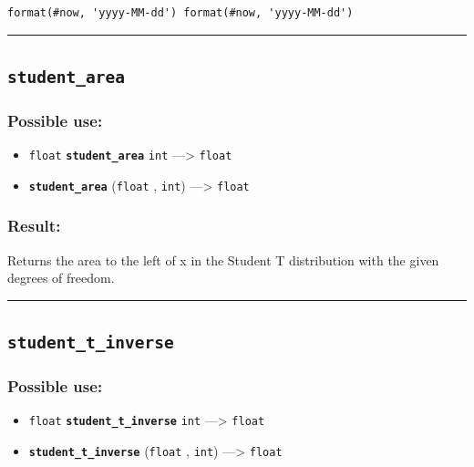\documentclass[]{book}
\providecommand{\tightlist}{%
  \setlength{\itemsep}{0pt}\setlength{\parskip}{0pt}}
\theoremstyle{definition}
\theoremstyle{definition}
\theoremstyle{definition}
\theoremstyle{remark}
\begin{document}
\begin{verbatim}
format(#now, 'yyyy-MM-dd') format(#now, 'yyyy-MM-dd') 
\end{verbatim}

\begin{center}\rule{0.5\linewidth}{\linethickness}\end{center}

\subsection{\texorpdfstring{\texttt{student\_area}}{student\_area}}\label{student_area}

\subsubsection{Possible use:}\label{possible-use-506}

\begin{itemize}
\tightlist
\item
  \texttt{float} \textbf{\texttt{student\_area}} \texttt{int}
  ---\textgreater{} \texttt{float}
\item
  \textbf{\texttt{student\_area}} (\texttt{float} , \texttt{int})
  ---\textgreater{} \texttt{float}
\end{itemize}

\subsubsection{Result:}\label{result-489}

Returns the area to the left of x in the Student T distribution with the
given degrees of freedom.

\begin{center}\rule{0.5\linewidth}{\linethickness}\end{center}

\subsection{\texorpdfstring{\texttt{student\_t\_inverse}}{student\_t\_inverse}}\label{student_t_inverse}

\subsubsection{Possible use:}\label{possible-use-507}

\begin{itemize}
\tightlist
\item
  \texttt{float} \textbf{\texttt{student\_t\_inverse}} \texttt{int}
  ---\textgreater{} \texttt{float}
\item
  \textbf{\texttt{student\_t\_inverse}} (\texttt{float} , \texttt{int})
  ---\textgreater{} \texttt{float}
\end{itemize}
\end{document}
